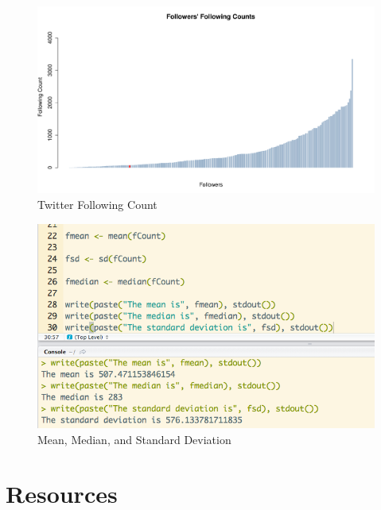 \documentclass{article}
\begin{document}
\begin{figure}[H]
\centering
\includegraphics[scale=0.38]{e2/FollowingCountGraph}
\caption{Twitter Following Count}
\label{followingcounts}
\end{figure}

\begin{figure}[H]
\centering
\includegraphics[scale=0.50]{e2/statsoutput}
\caption{Mean, Median, and Standard Deviation}
\label{statsoutputfollowing}
\end{figure}


\clearpage

\section*{Resources}
\end{document}
